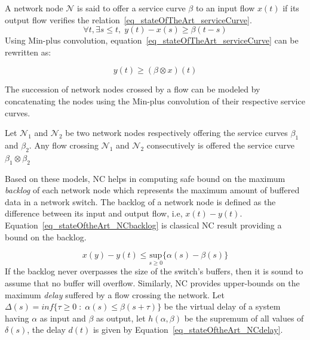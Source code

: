 \documentclass[main.tex]{subfiles}
\begin{document}
\begin{definition}
    A network node $\mathcal{N}$ is said to offer a service curve $\beta$ to an
    input flow $x(t)$ if its output flow verifies the
    relation~\ref{eq_stateOfTheArt_serviceCurve}.  \begin{equation}
        \label{eq_stateOfTheArt_serviceCurve}
        \forall t, \exists s \leq t, \; y(t) - x(s) \geq \beta(t-s)
    \end{equation}
    Using Min-plus convolution, equation~\ref{eq_stateOfTheArt_serviceCurve}
    can be rewritten as:

    \begin{displaymath}
        y(t) \geq ( \beta \otimes x ) (t)
    \end{displaymath}
\end{definition}
The succession of network nodes crossed by a flow can be modeled by
concatenating the nodes using the Min-plus convolution of their respective
service curves.
\begin{example}
    Let $\mathcal{N}_1$ and $\mathcal{N}_2$ be two network nodes respectively
    offering the service curves $\beta_1$ and $\beta_2$. Any flow crossing
    $\mathcal{N}_1$ and $\mathcal{N}_2$ consecutively is offered the service
    curve $\beta_1 \otimes \beta_2$
\end{example}
Based on these models, NC helps in computing safe bound on the maximum
\emph{backlog} of each network node which represents the maximum amount of
buffered data in a network switch. The backlog of a network node is defined as
the difference between its input and output flow, i.e, $x(t) - y(t)$.
Equation~\ref{eq_stateOftheArt_NCbacklog} is classical NC result providing a
bound on the backlog.

\begin{equation}
    \label{eq_stateOftheArt_NCbacklog}
    x(y) - y(t) \leq \underset{s \geq 0}{\text{sup}} \{ \alpha (s) - \beta (s) \}
\end{equation}
If the backlog never overpasses the size of the switch's buffers, then it is
sound to assume that no buffer will overflow. Similarly, NC provides
upper-bounds on the maximum \emph{delay} suffered by a flow crossing the
network. Let $\Delta (s) = inf \{ \tau \geq 0 \; : \; \alpha (s) \leq \beta ( s
+ \tau )\}$ be the virtual delay of a system having $\alpha$ as input and
$\beta$ as output, let $h( \alpha , \beta )$ be the supremum of all values of
$\delta (s)$, the delay $d(t)$ is given by
Equation~\ref{eq_stateOftheArt_NCdelay}.
\end{document}
